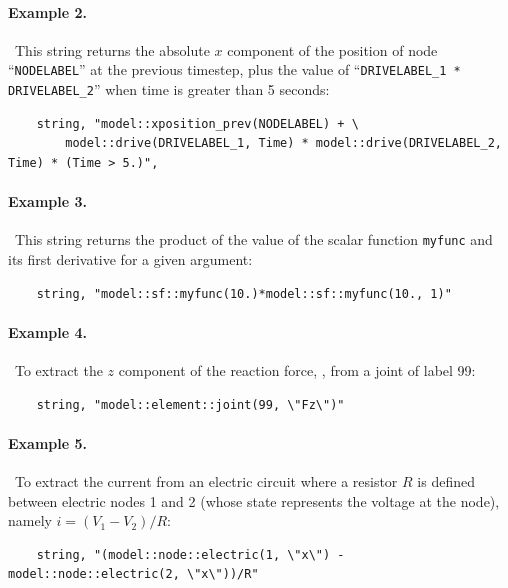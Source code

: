 \paragraph{Example 2.} \
This string returns the absolute $x$ component of the position of node ``\verb;NODELABEL;'' at the previous timestep, plus the value of ``\verb;DRIVELABEL_1 * DRIVELABEL_2;'' when time is greater than 5 seconds:
\begin{verbatim}
    string, "model::xposition_prev(NODELABEL) + \
        model::drive(DRIVELABEL_1, Time) * model::drive(DRIVELABEL_2, Time) * (Time > 5.)",
\end{verbatim}

\paragraph{Example 3.} \
This string returns the product of the value of the scalar function \texttt{myfunc} and its first derivative for a given argument:
\begin{verbatim}
    string, "model::sf::myfunc(10.)*model::sf::myfunc(10., 1)"
\end{verbatim}

\paragraph{Example 4.} \
To extract the $z$ component of the reaction force, , from a joint of label 99:
\begin{verbatim}
    string, "model::element::joint(99, \"Fz\")"
\end{verbatim}

\paragraph{Example 5.} \
To extract the current from an electric circuit where a resistor $R$ is defined between electric nodes 1 and 2 (whose state  represents the voltage at the node), namely $i = (V_1 - V_2)/R$:
\begin{verbatim}
    string, "(model::node::electric(1, \"x\") - model::node::electric(2, \"x\"))/R"
\end{verbatim}



